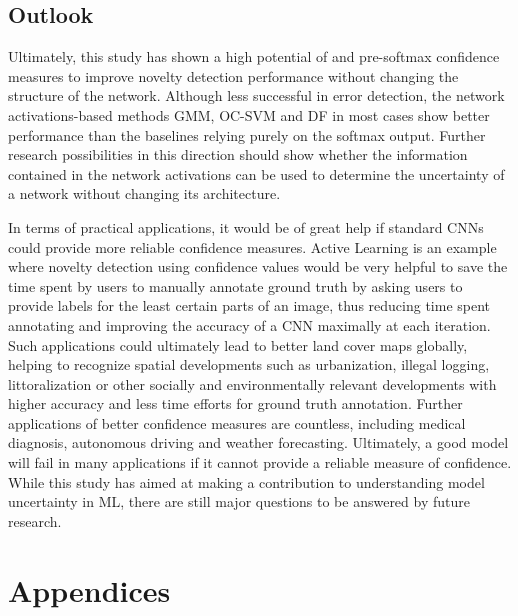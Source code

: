 \documentclass[10pt]{article}
\begin{document}
\subsection{Outlook}
\label{subsec:outlook}

Ultimately, this study has shown a high potential of  and pre-softmax confidence measures to improve novelty detection performance without changing the structure of the network. Although less successful in error detection, the network activations-based methods \gls{GMM}, \gls{OC-SVM} and \gls{DF} in most cases show better performance than the baselines relying purely on the softmax output. Further research possibilities in this direction should show whether the information contained in the network activations can be used to determine the uncertainty of a network without changing its architecture.

In terms of practical applications, it would be of great help if standard \glspl{CNN} could provide more reliable confidence measures. Active Learning is an example where novelty detection using confidence values would be very helpful to save the time spent by users to manually annotate ground truth by asking users to provide labels for the least certain parts of an image, thus reducing time spent annotating and improving the accuracy of a \gls{CNN} maximally at each iteration. Such applications could ultimately lead to better land cover maps globally, helping to recognize spatial developments such as urbanization, illegal logging, littoralization or other socially and environmentally relevant developments with higher accuracy and less time efforts for ground truth annotation. Further applications of better confidence measures are countless, including medical diagnosis, autonomous driving and weather forecasting. Ultimately, a good model will fail in many applications if it cannot provide a reliable measure of confidence. While this study has aimed at making a contribution to understanding model uncertainty in \gls{ML}, there are still major questions to be answered by future research.

\newpage
\printbibliography

\newpage
\renewcommand{\thesubsection}{\Alph{subsection}}
\pagebreak  

\section{Appendices}
\end{document}
